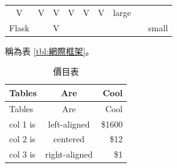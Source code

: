 \documentclass[12pt,,]{report}
\begin{document}
\begin{longtable}[]{@{}ccccccccc@{}}
\begin{minipage}[t]{0.04\columnwidth}
V\strut
\end{minipage} & \begin{minipage}[t]{0.04\columnwidth}\centering
V\strut
\end{minipage} & \begin{minipage}[t]{0.04\columnwidth}\centering
V\strut
\end{minipage} & \begin{minipage}[t]{0.13\columnwidth}\centering
V\strut
\end{minipage} & \begin{minipage}[t]{0.11\columnwidth}\centering
V\strut
\end{minipage} & \begin{minipage}[t]{0.12\columnwidth}\centering
V\strut
\end{minipage} & \begin{minipage}[t]{0.11\columnwidth}\centering
large\strut
\end{minipage}\tabularnewline
\begin{minipage}[t]{0.09\columnwidth}\centering
Flask\strut
\end{minipage} & \begin{minipage}[t]{0.07\columnwidth}\centering
2010\strut
\end{minipage} & \begin{minipage}[t]{0.04\columnwidth}\centering
V\strut
\end{minipage} & \begin{minipage}[t]{0.04\columnwidth}\centering
\strut
\end{minipage} & \begin{minipage}[t]{0.04\columnwidth}\centering
\strut
\end{minipage} & \begin{minipage}[t]{0.13\columnwidth}\centering
\strut
\end{minipage} & \begin{minipage}[t]{0.11\columnwidth}\centering
\strut
\end{minipage} & \begin{minipage}[t]{0.12\columnwidth}\centering
\strut
\end{minipage} & \begin{minipage}[t]{0.11\columnwidth}\centering
small\strut
\end{minipage}\tabularnewline
\bottomrule
\end{longtable}

稱為表 \ref{tbl:網際框架}。

\begin{longtable}[]{@{}lcr@{}}
\caption{價目表 \label{tbl:價目表}}\tabularnewline
\toprule
Tables & Are & Cool\tabularnewline
\midrule
\endfirsthead
\toprule
Tables & Are & Cool\tabularnewline
\midrule
\endhead
col 1 is & left-aligned & \$1600\tabularnewline
col 2 is & centered & \$12\tabularnewline
col 3 is & right-aligned & \$1\tabularnewline
\bottomrule
\end{longtable}
\end{document}
